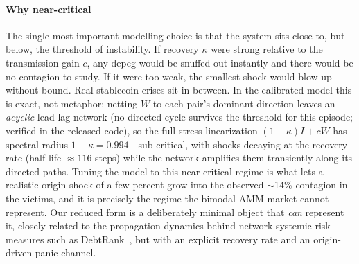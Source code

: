 \documentclass[sigconf,anonymous]{acmart}
\begin{document}
\paragraph{Why near-critical} The single most important modelling choice is that the system sits
close to, but below, the threshold of instability. If recovery $\kappa$ were strong relative to the
transmission gain $c$, any depeg would be snuffed out instantly and there would be no contagion to
study. If it were too weak, the smallest shock would blow up without bound. Real stablecoin crises
sit in between. In the calibrated model this is exact, not metaphor: netting $W$ to each pair's dominant direction
leaves an \emph{acyclic} lead-lag network (no directed cycle survives the threshold for this episode;
verified in the released code), so the full-stress linearization $(1{-}\kappa)I + cW$ has spectral
radius $1{-}\kappa = 0.994$---sub-critical, with shocks decaying at the recovery rate (half-life
${\approx}116$ steps) while the network amplifies them transiently along its directed paths. Tuning the model to this near-critical
regime is what lets a realistic origin shock of a few percent grow into the observed $\sim$14\%
contagion in the victims, and it is precisely the regime the bimodal AMM market cannot
represent. Our reduced form is a deliberately minimal object that
\emph{can} represent it, closely related to the propagation dynamics behind network systemic-risk
measures such as DebtRank~\cite{battiston2012debtrank}, but with an explicit recovery rate and an
origin-driven panic channel.
\end{document}
